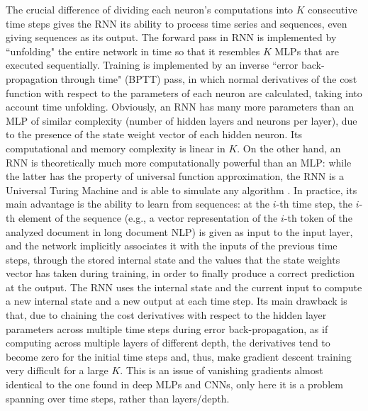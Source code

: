 \documentclass[preprint,review,10pt]{elsarticle}
\begin{document}
	The crucial difference of dividing each neuron's computations into $K$ consecutive time steps gives the RNN its ability to process time series and sequences, even giving sequences as its output. The forward pass in RNN is implemented by ``unfolding" the entire network in time so that it resembles $K$ MLPs that are executed sequentially. Training is implemented by an inverse ``error back-propagation through time" (BPTT) pass, in which normal derivatives of the cost function with respect to the parameters of each neuron are calculated, taking into account time unfolding. Obviously, an RNN has many more parameters than an MLP of similar complexity (number of hidden layers and neurons per layer), due to the presence of the state weight vector of each hidden neuron. Its computational and memory complexity is linear in $K$. On the other hand, an RNN is theoretically much more computationally powerful than an MLP: while the latter has the property of universal function approximation, the RNN is a Universal Turing Machine and is able to simulate any algorithm \cite{siegelman}. In practice, its main advantage is the ability to learn from sequences: at the $i$-th time step, the $i$-th element of the sequence (e.g., a vector representation of the $i$-th token of the analyzed document in long document NLP) is given as input to the input layer, and the network implicitly associates it with the inputs of the previous time steps, through the stored internal state and the values that the state weights vector has taken during training, in order to finally produce a correct prediction at the output. The RNN uses the internal state and the current input to compute a new internal state and a new output at each time step. Its main drawback is that, due to chaining the cost derivatives with respect to the hidden layer parameters across multiple time steps during error back-propagation, as if computing across multiple layers of different depth, the derivatives tend to become zero for the initial time steps and, thus, make gradient descent training very difficult for a large $K$. This is an issue of vanishing gradients almost identical to the one found in deep MLPs and CNNs, only here it is a problem spanning over time steps, rather than layers/depth.
	
\end{document}
